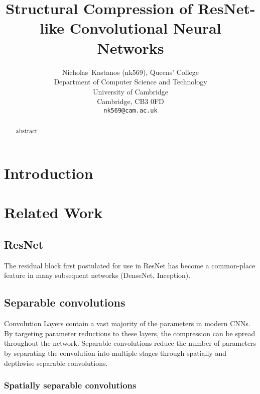 \documentclass{article}
\title{Structural Compression of ResNet-like Convolutional Neural Networks}
\author{%
	Nicholas~Kastanos (nk569), Queens' College \\
	Department of Computer Science and Technology\\
	University of Cambridge\\
	Cambridge, CB3 0FD\\
	\texttt{nk569@cam.ac.uk} \\
}
\begin{document}
	
	\maketitle
	
	\begin{abstract}
		abstract
	\end{abstract}
	
	\section{Introduction}
	
	
	
	
	\section{Related Work}
	\subsection{ResNet}
	
	The residual block first postulated for use in ResNet has become a common-place feature in many subsequent networks (DenseNet, Inception). 
	
	\subsection{Separable convolutions}
	
	Convolution Layers contain a vast majority of the parameters in modern CNNs. By targeting parameter reductions to these layers, the compression can be spread throughout the network. Separable convolutions reduce the number of parameters by separating the convolution into multiple stages through spatially and depthwise separable convolutions.
	
	\subsubsection{Spatially separable convolutions}
	
	
\end{document}
